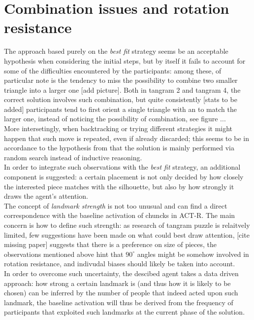 \documentclass[a4paper,singleside,12pt]{report} %
\begin{document}
	\section*{Combination issues and rotation resistance}
	The approach based purely on the \textit{best fit} strategy seems be an acceptable hypothesis
	when considering the initial steps, but by itself it fails to account for some of the difficulties
	encountered by the participants: among these, of particular note is the tendency to miss the
	possibility to combine two smaller triangle into a larger one [add picture]. Both in tangram 2
	and tangram 4, the correct solution involves such combination, but quite consistently [stats to
	be added] participants tend to first orient a single triangle with an to match the
	larger one, instead of noticing the possibility of combination, see figure ... \\
	More intersetingly, when backtracking or trying different strategies it might happen that such
	move is repeated, even if already discarded; this seems to be in accordance to the hypothesis
	from \cite{Hu2019EffectiveCO} that the solution is mainly performed via random search instead of
	inductive reasoning.\\
	In order to integrate such observations with the \textit{best fit} strategy, an additional
	component is suggested: a certain placement is not only decided by how closely the interested
	piece matches with the silhouette, but also by how strongly it draws the agent's attention.\\
	The concept of \textit{landmark strength} is not too unusual and can find a direct
	correspondence with the baseline activation of chuncks in ACT-R. The main concern is how to
	define such strength: as research of tangram puzzle is relaitvely limited, few suggestions have
	been made on what could best draw attention, [cite missing paper] suggests that there is a
	preference on size of pieces, the observations mentioned above hint that $90^{\circ}$ angles might be
	somehow involved in rotation resistance, and indivudal biases should likely be taken into
	account.\\
	In order to overcome such uncertainty, the descibed agent takes a data driven approach: how
	strong a certain landmark is (and thus how it is likely to be chosen) can be inferred by the
	number of people that indeed acted upon such landmark, the baseline activation will thus be
	derived from the frequency of participants that exploited such landmarks at the current phase of
	the solution.
\end{document}
